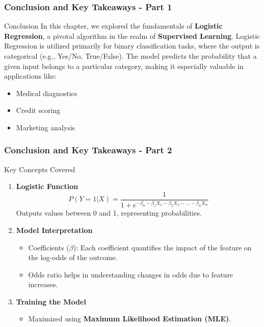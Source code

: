 \documentclass[aspectratio=169]{beamer}
\begin{document}
\begin{frame}[fragile]
    \frametitle{Conclusion and Key Takeaways - Part 1}
    \begin{block}{Conclusion}
        In this chapter, we explored the fundamentals of \textbf{Logistic Regression}, a pivotal algorithm in the realm of \textbf{Supervised Learning}. 
        Logistic Regression is utilized primarily for binary classification tasks, where the output is categorical (e.g., Yes/No, True/False).
        The model predicts the probability that a given input belongs to a particular category, making it especially valuable in applications like:
    \end{block}
    \begin{itemize}
        \item Medical diagnostics
        \item Credit scoring
        \item Marketing analysis
    \end{itemize}
\end{frame}

\begin{frame}[fragile]
    \frametitle{Conclusion and Key Takeaways - Part 2}
    \begin{block}{Key Concepts Covered}
        \begin{enumerate}
            \item \textbf{Logistic Function}
                \begin{equation}
                P(Y=1|X) = \frac{1}{1 + e^{-\beta_0 - \beta_1 X_1 - \beta_2 X_2 - \ldots - \beta_n X_n}}
                \end{equation}
                Outputs values between 0 and 1, representing probabilities.
                
            \item \textbf{Model Interpretation}
                \begin{itemize}
                    \item Coefficients (\(\beta\)): Each coefficient quantifies the impact of the feature on the log-odds of the outcome.
                    \item Odds ratio helps in understanding changes in odds due to feature increases.
                \end{itemize}

            \item \textbf{Training the Model}
                \begin{itemize}
                    \item Maximized using \textbf{Maximum Likelihood Estimation (MLE)}.
                \end{itemize}
        \end{enumerate}
    \end{block}
\end{frame}
\end{document}
